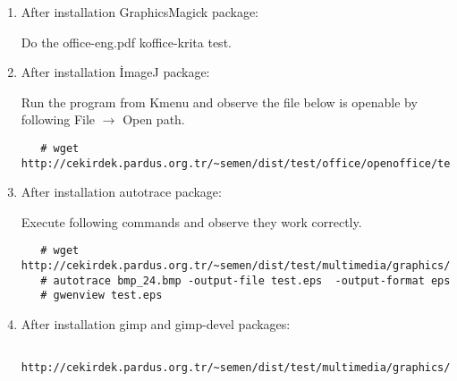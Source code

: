 \documentclass[a4paper,10pt]{article}
\begin{document}
\begin{enumerate}
lang\_LANG is format, for example: pt-BT is pt\_BT.

After that, execute gimp command and observe laguage is changed to which you decide.
\begin{verbatim}
gimp-i18n-es
gimp-i18n-sk
gimp-i18n-sl
gimp-i18n-sr
gimp-i18n-sr_Latn
gimp-i18n-sv
gimp-i18n-ta
gimp-i18n-th
gimp-i18n-tt
gimp-i18n-uk
gimp-i18n-vi
gimp-i18n-et
gimp-i18n-eu
gimp-i18n-fa
gimp-i18n-fi
gimp-i18n-fr
gimp-i18n-ga
gimp-i18n-gl
gimp-i18n-gu
gimp-i18n-he
gimp-i18n-hi
gimp-i18n-xh
gimp-i18n-yi
gimp-i18n-zh_CN
gimp-i18n-zh_HK
gimp-i18n-zh_TW
gimp-i18n-hr
gimp-i18n-hu
gimp-i18n-id
gimp-i18n-is
gimp-i18n-it
gimp-i18n-ja
gimp-i18n-ka
gimp-i18n-km
gimp-i18n-kn
gimp-i18n-ko
gimp-i18n-lt
gimp-i18n-lv
gimp-i18n-mk
gimp-i18n-ml
gimp-i18n-mr
gimp-i18n-ms
gimp-i18n-nb
gimp-i18n-ne
gimp-i18n-nl
gimp-i18n-nn
gimp-i18n-oc
gimp-i18n-or
gimp-i18n-pa
gimp-i18n-pl
gimp-i18n-pt
gimp-i18n-pt_BR
gimp-i18n-ro
gimp-i18n-ru
gimp-i18n-rw
gimp-i18n-si 
\end{verbatim}


\item After installation GraphicsMagick package:

Do the office-eng.pdf koffice-krita test.

\item After installation İmageJ package:

 Run the program from Kmenu and observe the file below is openable by following File $\rightarrow$ Open path.
  \begin{verbatim}
   # wget http://cekirdek.pardus.org.tr/~semen/dist/test/office/openoffice/test_oodraw.jpg
  \end{verbatim}

\item After installation autotrace package:

Execute following commands and observe they work correctly.
  \begin{verbatim}
   # wget http://cekirdek.pardus.org.tr/~semen/dist/test/multimedia/graphics/bmp_24.bmp
   # autotrace bmp_24.bmp -output-file test.eps  -output-format eps
   # gwenview test.eps 
  \end{verbatim}

 \item After installation gimp and gimp-devel packages:
  \begin{verbatim}
   http://cekirdek.pardus.org.tr/~semen/dist/test/multimedia/graphics/graphics.tar
  \end{verbatim}


\end{enumerate}
\end{document}
